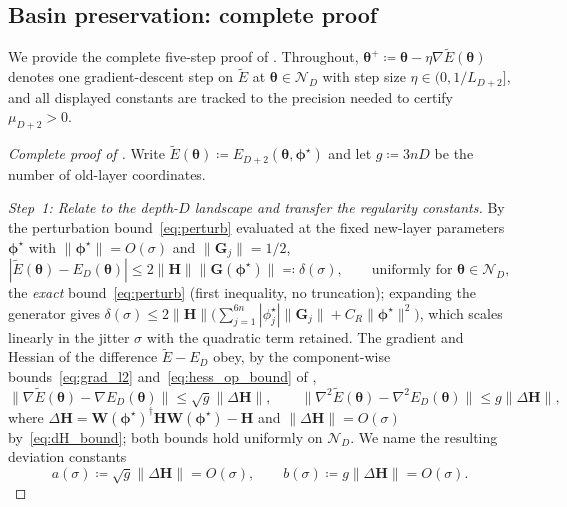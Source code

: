 \documentclass[11pt]{article}
\newcommand{\cN}{\mathcal{N}}
\theoremstyle{plain}
\theoremstyle{plain}
\begin{document}
\subsection{Basin preservation: complete proof}
\label{app:basin_complete}
We provide the complete five-step proof of .  Throughout,
$\bm\theta^+\coloneqq\bm\theta-\eta\nabla\widetilde{E}(\bm\theta)$ denotes
one gradient-descent step on $\widetilde{E}$ at $\bm\theta\in\cN_D$ with
step size $\eta\in(0,1/L_{D+2}]$, and all displayed constants are tracked
to the precision needed to certify $\mu_{D+2}>0$.
\begin{proof}[Complete proof of ]
Write $\widetilde{E}(\bm\theta)\coloneqq E_{D+2}(\bm\theta,\bm\phi^\star)$
and let $g\coloneqq 3nD$ be the number of old-layer coordinates.

\emph{Step~1: Relate to the depth-$D$ landscape and transfer the
regularity constants.}
By the perturbation bound~\eqref{eq:perturb} evaluated at the fixed
new-layer parameters $\bm\phi^\star$ with $\|\bm\phi^\star\|=O(\sigma)$
and $\|\mathbf{G}_j\|=1/2$,
\begin{equation}\label{eq:basin_energy_prox}
  |\widetilde{E}(\bm\theta)-E_D(\bm\theta)|
  \le 2\|\mathbf{H}\| \|\mathbf{G}(\bm\phi^\star)\|
  \eqqcolon\delta(\sigma),
  \qquad\text{uniformly for }\bm\theta\in\cN_D,
\end{equation}
the \emph{exact} bound~\eqref{eq:perturb} (first inequality, no
truncation); expanding the generator gives
$\delta(\sigma)\le 2\|\mathbf{H}\|\bigl(\sum_{j=1}^{6n}|\phi_j^\star| \|\mathbf{G}_j\|
+C_R\|\bm\phi^\star\|^2\bigr)$, which scales linearly in the jitter
$\sigma$ with the quadratic term retained.
The gradient and Hessian of the difference $\widetilde{E}-E_D$ obey, by
the component-wise bounds~\eqref{eq:grad_l2} and~\eqref{eq:hess_op_bound}
of ,
\begin{equation}\label{eq:basin_grad_hess}
  \|\nabla\widetilde{E}(\bm\theta)-\nabla E_D(\bm\theta)\|
  \le\sqrt{g} \|\Delta\mathbf{H}\|,
  \qquad
  \|\nabla^2\widetilde{E}(\bm\theta)-\nabla^2 E_D(\bm\theta)\|
  \le g \|\Delta\mathbf{H}\|,
\end{equation}
where $\Delta\mathbf{H}=\mathbf{W}(\bm\phi^\star)^\dagger\mathbf{H} \mathbf{W}(\bm\phi^\star)-\mathbf{H}$
and $\|\Delta\mathbf{H}\|=O(\sigma)$ by~\eqref{eq:dH_bound}; both bounds hold
uniformly on $\cN_D$.  We name the resulting deviation constants
\begin{equation}\label{eq:basin_deviation_constants}
  a(\sigma)\coloneqq\sqrt{g} \|\Delta\mathbf{H}\|=O(\sigma),
  \qquad
  b(\sigma)\coloneqq g \|\Delta\mathbf{H}\|=O(\sigma).
\end{equation}


\end{proof}
\end{document}
